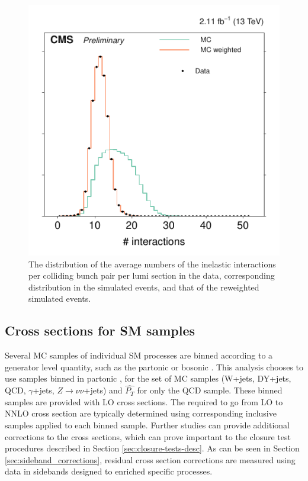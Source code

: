 \begin{figure}[!b]
\centering
\includegraphics[scale=1.00]{figures/pileup_reweighting/f044_corr_nTrueInt_data_mc_norm}
\caption{The distribution of the average numbers of the inelastic
interactions per colliding bunch pair per lumi section in the data,
corresponding distribution in the simulated events, and that of the
reweighted simulated events.} \label{f044_corr_nTrueInt_data_mc_norm}
\end{figure}


\subsection{Cross sections for SM samples}
Several MC samples of individual SM processes are binned according to a generator level quantity, such as the partonic \HT or bosonic \PT.
This analysis chooses to use samples binned in partonic \HT, for the set of MC samples (W+jets, DY+jets, QCD, $\gamma$+jets, $Z\rightarrow \nu\nu$+jets) and $\hat{P_{T}}$
for only the QCD sample.
These binned samples are provided with LO cross sections. The \kfactors required to go from LO to NNLO cross section are typically determined using corresponding
inclusive samples applied to each \HT binned sample.
Further studies can provide additional corrections to the cross sections, which can prove important to the closure test procedures described in
Section \ref{sec:closure-tests-desc}. As can be seen in Section \ref{sec:sideband_corrections}, residual cross section
corrections are measured using data in sidebands designed to enriched specific processes.

